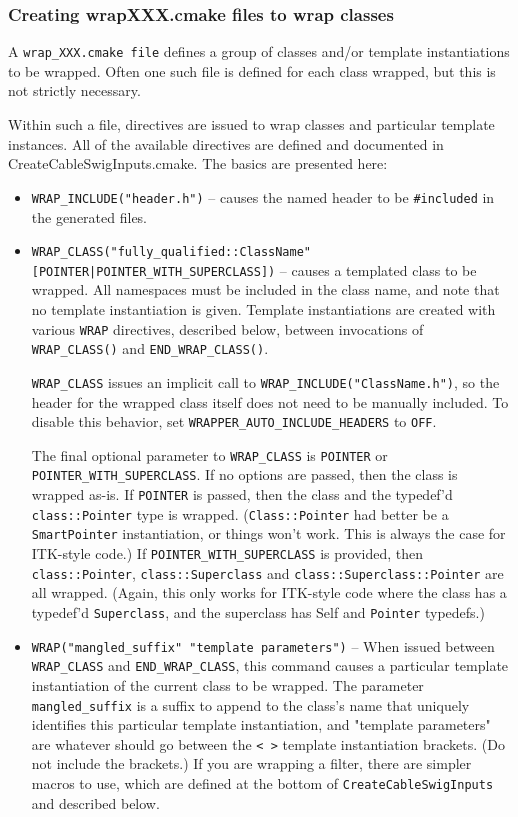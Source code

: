 \documentclass{InsightArticle}
\begin{document}
     \subsubsection{Creating wrapXXX.cmake files to wrap classes}

A \verb$wrap_XXX.cmake file$ defines a group of classes and/or template instantiations
to be wrapped. Often one such file is defined for each class wrapped, but this
is not strictly necessary.

Within such a file, directives are issued to wrap classes and particular
template instances. All of the available directives are defined and documented
in CreateCableSwigInputs.cmake. The basics are presented here:

\begin{itemize}
  \item \verb$WRAP_INCLUDE("header.h")$ -- causes the named header to be \verb$#included$ in the
generated files. 

  \item \verb$WRAP_CLASS("fully_qualified::ClassName" [POINTER|POINTER_WITH_SUPERCLASS])$ --
causes a templated class to be wrapped. All namespaces must be included in the
class name, and note that no template instantiation is given. Template
instantiations are created with various \verb$WRAP$ directives, described below,
between invocations of \verb$WRAP_CLASS()$ and \verb$END_WRAP_CLASS()$.

\verb$WRAP_CLASS$ issues an implicit call to \verb$WRAP_INCLUDE("ClassName.h")$, so the header
for the wrapped class itself does not need to be manually included. To disable
this behavior, set \verb$WRAPPER_AUTO_INCLUDE_HEADERS$ to \verb$OFF$.

The final optional parameter to \verb$WRAP_CLASS$ is \verb$POINTER$ or
\verb$POINTER_WITH_SUPERCLASS$. If no options are passed, then the class is wrapped
as-is. If \verb$POINTER$ is passed, then the class and the typedef'd \verb$class::Pointer$
type is wrapped. (\verb$Class::Pointer$ had better be a \verb$SmartPointer$ instantiation, or
things won't work. This is always the case for ITK-style code.) If
\verb$POINTER_WITH_SUPERCLASS$ is provided, then \verb$class::Pointer$, \verb$class::Superclass$ and
\verb$class::Superclass::Pointer$ are all wrapped. (Again, this only works for
ITK-style code where the class has a typedef'd \verb$Superclass$, and the superclass
has Self and \verb$Pointer$ typedefs.)

  \item \verb$WRAP("mangled_suffix" "template parameters")$ -- When issued between \verb$WRAP_CLASS$
and \verb$END_WRAP_CLASS$, this command causes a particular template instantiation of
the current class to be wrapped. The parameter \verb$mangled_suffix$ is a suffix to
append to the class's name that uniquely identifies this particular template
instantiation, and "template parameters" are whatever should go between the \verb$< >$
template instantiation brackets. (Do not include the brackets.) If you are
wrapping a filter, there are simpler macros to use, which are defined at the
bottom of \verb$CreateCableSwigInputs$ and described below.


\end{itemize}
\end{document}
